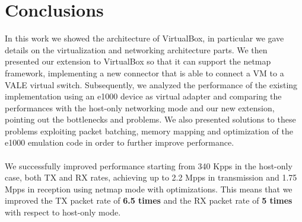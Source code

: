 \documentclass[a4paper, 12pt, titlepage]{report}
\begin{document}
\chapter{Conclusions}
In this work we showed the architecture of VirtualBox, in particular we gave details on the virtualization and networking architecture parts. We then presented our extension to VirtualBox so that it can support the netmap framework, implementing a new connector that is able to connect a VM to a VALE virtual switch. Subsequently, we analyzed the performance of the existing implementation using an e1000 device as virtual adapter and comparing the performances with the host-only networking mode and our new extension, pointing out the bottlenecks and problems. We also presented solutions to these problems exploiting packet batching, memory mapping and optimization of the e1000 emulation code in order to further improve performance.
\\
\\
We successfully improved performance starting from 340 Kpps in the host-only case, both TX and RX rates, achieving up to 2.2 Mpps in transmission and 1.75 Mpps in reception using netmap mode with optimizations. This means that we improved the TX packet rate of \textbf{6.5 times} and the RX packet rate of \textbf{5 times} with respect to host-only mode.
\end{document}
